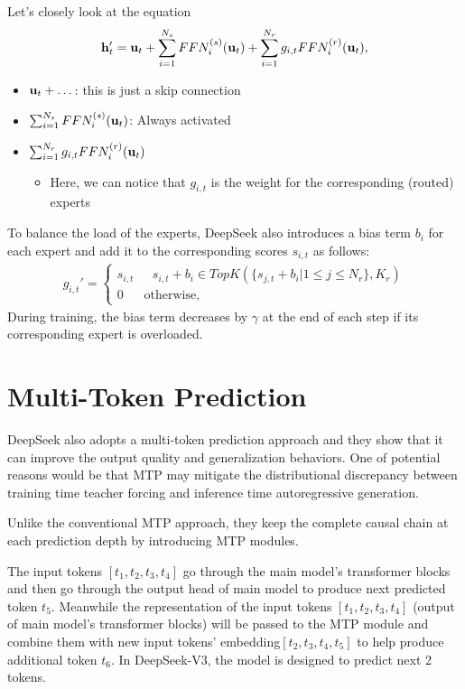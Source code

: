 Let's closely look at the equation
\begin{align*}
	{\mathbf{h}}_t' = {\mathbf{u}}_t+\sum^{N_s}_{i=1}FFN_i^{(s)}({\mathbf{u}}_t)+\sum^{N_r}_{i=1}g_{i,t}FFN_i^{(r)}({\mathbf{u}}_t),
\end{align*}
\begin{itemize}
	\item ${\mathbf{u}}_t+\dots$: this is just a skip connection
	\item $\sum^{N_s}_{i=1}FFN_i^{(s)}({\mathbf{u}}_t)$: Always activated
	\item $\sum^{N_r}_{i=1}g_{i,t}FFN_i^{(r)}({\mathbf{u}}_t)$
		\begin{itemize}
			\item Here, we can notice that $g_{i,t}$ is the weight for the corresponding (routed) experts
		\end{itemize}
\end{itemize}

To balance the load of the experts, DeepSeek also introduces a bias term $b_i$ for each expert and add it to the corresponding scores $s_{i,t}$ as follows:
\begin{align*}
	g_{i,t}' = \begin{cases}
		s_{i,t}&\text{ } s_{i,t}+b_i\in TopK(\{s_{j,t}+b_i|1\leq j \leq N_r\}, K_r)\\
		0&\text{otherwise,}
	\end{cases}
\end{align*}
During training, the bias term decreases by $\gamma$ at the end of each step if its corresponding expert is overloaded. 


\section{Multi-Token Prediction}

DeepSeek also adopts a multi-token prediction approach and they show that it can improve the output quality and generalization behaviors. One of potential reasons would be that MTP may mitigate the distributional discrepancy between training time teacher forcing and inference time autoregressive generation.

Unlike the conventional MTP approach, they keep the complete causal chain at each prediction depth by introducing MTP modules.

The input tokens $[t_1,t_2,t_3,t_4]$ go through the main model's transformer blocks and then go through the output head of main model to produce next predicted token $t_5$. Meanwhile the representation of the input tokens $[t_1,t_2,t_3,t_4]$ (\ie output of main model's transformer blocks) will be passed to the MTP module and combine them with new input tokens' embedding$[t_2,t_3,t_4,t_5]$ to help produce additional token $t_6$. In DeepSeek-V3, the model is designed to predict next 2 tokens.

